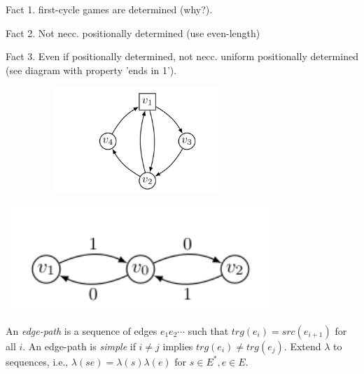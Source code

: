 \documentclass[a4paper,10pt]{article}
\begin{document}
Fact 1. first-cycle games are determined (why?). 

Fact 2. Not necc. positionally determined (use even-length)

Fact 3. Even if positionally determined, not necc. uniform positionally determined (see diagram with property 'ends in 1').

 \begin{center}\includegraphics[width=10cm,height=4cm]{fcg-notpositional.png} \end{center}
 \begin{center}\includegraphics[width=10cm,height=4cm]{fcg-notuniform.png} \end{center}

\begin{definition}
An \emph{edge-path} is a sequence of edges $e_1 e_2 \cdots$ such that $trg(e_i) = src(e_{i+1})$ for all $i$. An edge-path is \emph{simple} if $i \neq j$ implies $trg(e_i) \neq trg(e_j)$.
Extend $\lambda$ to sequences, i.e., $\lambda(s e) = \lambda(s) \lambda(e)$ for $s \in E^*, e \in E$.

 
%  
\end{definition} 
\end{document}

